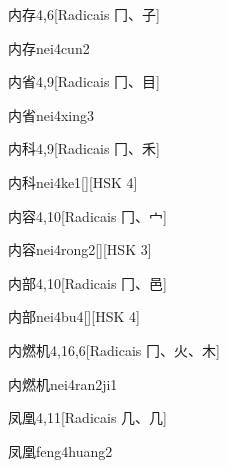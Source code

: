 \begin{entry}{内存}{4,6}[Radicais ⼌、⼦]
  \begin{phonetics}{内存}{nei4cun2}
  \end{phonetics}
\end{entry}

\begin{entry}{内省}{4,9}[Radicais ⼌、⽬]
  \begin{phonetics}{内省}{nei4xing3}
  \end{phonetics}
\end{entry}

\begin{entry}{内科}{4,9}[Radicais ⼌、⽲]
  \begin{phonetics}{内科}{nei4ke1}[][HSK 4]
  \end{phonetics}
\end{entry}

\begin{entry}{内容}{4,10}[Radicais ⼌、⼧]
  \begin{phonetics}{内容}{nei4rong2}[][HSK 3]
  \end{phonetics}
\end{entry}

\begin{entry}{内部}{4,10}[Radicais ⼌、⾢]
  \begin{phonetics}{内部}{nei4bu4}[][HSK 4]
  \end{phonetics}
\end{entry}

\begin{entry}{内燃机}{4,16,6}[Radicais ⼌、⽕、⽊]
  \begin{phonetics}{内燃机}{nei4ran2ji1}
  \end{phonetics}
\end{entry}

\begin{entry}{凤凰}{4,11}[Radicais ⼏、⼏]
  \begin{phonetics}{凤凰}{feng4huang2}
  \end{phonetics}
\end{entry}

